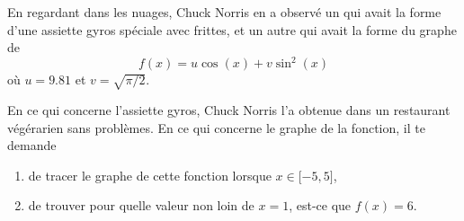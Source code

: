 \begin{exercice}\label{exoLCexoMatlab0007}

En regardant dans les nuages, Chuck Norris en a observé un qui avait la forme d'une assiette gyros spéciale avec frittes, et un autre qui avait la forme du graphe de
\begin{equation}
       \nonumber f(x)=u\cos(x)+v\sin^2(x)
\end{equation}
où $u=9.81$ et $v=\sqrt{\pi/2}$.

En ce qui concerne l'assiette gyros, Chuck Norris l'a obtenue dans un restaurant végérarien sans problèmes. En ce qui concerne le graphe de la fonction, il te demande
\begin{enumerate}

       \item
               de tracer le graphe de cette fonction lorsque $x\in\mathopen[ -5 , 5 \mathclose]$,
       \item
               de trouver pour quelle valeur non loin de $x=1$, est-ce que $f(x)=6$.

\end{enumerate}

\end{exercice}

